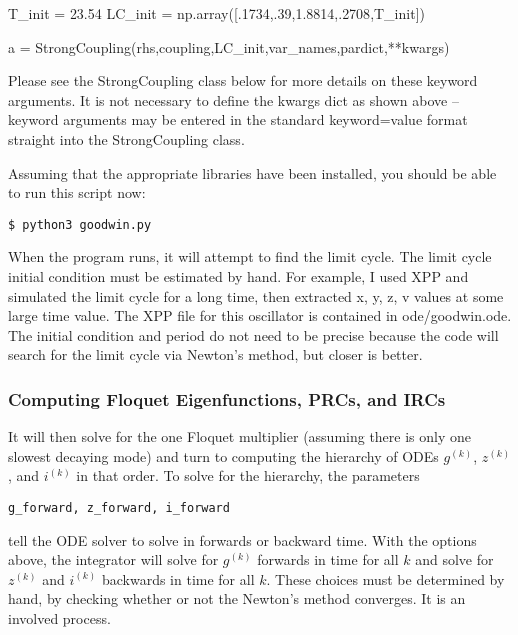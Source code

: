 \documentclass[english,a4paper,oneside]{article}
\newenvironment{Shaded}{}{}
\newcommand{\DecValTok}[1]{\textcolor[rgb]{0.25,0.63,0.44}{#1}}
\newcommand{\FloatTok}[1]{\textcolor[rgb]{0.25,0.63,0.44}{#1}}
\newcommand{\NormalTok}[1]{#1}
\newcommand{\OperatorTok}[1]{\textcolor[rgb]{0.40,0.40,0.40}{#1}}
\begin{document}
\begin{Shaded}
\begin{Highlighting}[]
\NormalTok{    T_init }\OperatorTok{=} \FloatTok{23.54}
\NormalTok{    LC_init }\OperatorTok{=}\NormalTok{ np.array([.}\DecValTok{1734}\NormalTok{,.}\DecValTok{39}\NormalTok{,}\FloatTok{1.8814}\NormalTok{,.}\DecValTok{2708}\NormalTok{,T_init])}
    
\NormalTok{    a }\OperatorTok{=}\NormalTok{ StrongCoupling(rhs,coupling,LC_init,var_names,pardict,}\OperatorTok{**}\NormalTok{kwargs)}
\end{Highlighting}
\end{Shaded}

Please see the StrongCoupling class below for more details on these
keyword arguments. It is not necessary to define the kwargs dict as
shown above -- keyword arguments may be entered in the standard
keyword=value format straight into the StrongCoupling class.

Assuming that the appropriate libraries have been installed, you should
be able to run this script now:

\begin{verbatim}
$ python3 goodwin.py
\end{verbatim}

When the program runs, it will attempt to find the limit cycle. The
limit cycle initial condition must be estimated by hand. For example, I
used XPP and simulated the limit cycle for a long time, then extracted
x, y, z, v values at some large time value. The XPP file for this
oscillator is contained in ode/goodwin.ode. The initial condition and
period do not need to be precise because the code will search for the
limit cycle via Newton's method, but closer is better.

\hypertarget{computing-floquet-eigenfunctions-prcs-and-ircs}{%
\subsubsection{Computing Floquet Eigenfunctions, PRCs, and
IRCs}\label{computing-floquet-eigenfunctions-prcs-and-ircs}}

It will then solve for the one Floquet multiplier (assuming there is
only one slowest decaying mode) and turn to computing the hierarchy of
ODEs \(g^{(k)}\), \(z^{(k)}\), and \(i^{(k)}\) in that order. To solve
for the hierarchy, the parameters

\begin{verbatim}
g_forward, z_forward, i_forward
\end{verbatim}

tell the ODE solver to solve in forwards or backward time. With the
options above, the integrator will solve for \(g^{(k)}\) forwards in
time for all \(k\) and solve for \(z^{(k)}\) and \(i^{(k)}\) backwards
in time for all \(k\). These choices must be determined by hand, by
checking whether or not the Newton's method converges. It is an involved
process.
\end{document}
